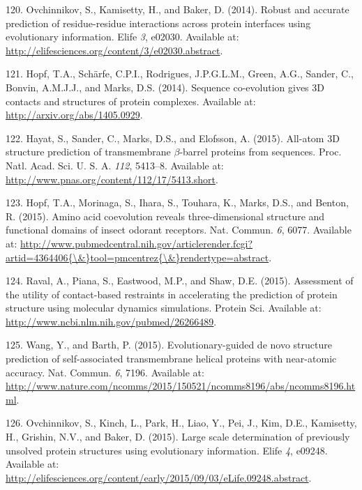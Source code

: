 \documentclass[11pt,a4paper,twoside]{book}
\theoremstyle{definition}
\theoremstyle{definition}
\theoremstyle{remark}
\begin{document}
\hypertarget{ref-Ovchinnikov2014a}{}
120. Ovchinnikov, S., Kamisetty, H., and Baker, D. (2014). Robust and
accurate prediction of residue-residue interactions across protein
interfaces using evolutionary information. Elife \emph{3}, e02030.
Available at: \url{http://elifesciences.org/content/3/e02030.abstract}.

\hypertarget{ref-Hopf2014}{}
121. Hopf, T.A., Schärfe, C.P.I., Rodrigues, J.P.G.L.M., Green, A.G.,
Sander, C., Bonvin, A.M.J.J., and Marks, D.S. (2014). Sequence
co-evolution gives 3D contacts and structures of protein complexes.
Available at: \url{http://arxiv.org/abs/1405.0929}.

\hypertarget{ref-Hayat2015a}{}
122. Hayat, S., Sander, C., Marks, D.S., and Elofsson, A. (2015).
All-atom 3D structure prediction of transmembrane \(\beta\)-barrel
proteins from sequences. Proc. Natl. Acad. Sci. U. S. A. \emph{112},
5413--8. Available at:
\url{http://www.pnas.org/content/112/17/5413.short}.

\hypertarget{ref-Hopf2015a}{}
123. Hopf, T.A., Morinaga, S., Ihara, S., Touhara, K., Marks, D.S., and
Benton, R. (2015). Amino acid coevolution reveals three-dimensional
structure and functional domains of insect odorant receptors. Nat.
Commun. \emph{6}, 6077. Available at:
\href{http://www.pubmedcentral.nih.gov/articlerender.fcgi?artid=4364406\%7B/\&\%7Dtool=pmcentrez\%7B/\&\%7Drendertype=abstract}{http://www.pubmedcentral.nih.gov/articlerender.fcgi?artid=4364406\{\textbackslash{}\&\}tool=pmcentrez\{\textbackslash{}\&\}rendertype=abstract}.

\hypertarget{ref-Raval2015a}{}
124. Raval, A., Piana, S., Eastwood, M.P., and Shaw, D.E. (2015).
Assessment of the utility of contact-based restraints in accelerating
the prediction of protein structure using molecular dynamics
simulations. Protein Sci. Available at:
\url{http://www.ncbi.nlm.nih.gov/pubmed/26266489}.

\hypertarget{ref-Wang2015}{}
125. Wang, Y., and Barth, P. (2015). Evolutionary-guided de novo
structure prediction of self-associated transmembrane helical proteins
with near-atomic accuracy. Nat. Commun. \emph{6}, 7196. Available at:
\url{http://www.nature.com/ncomms/2015/150521/ncomms8196/abs/ncomms8196.html}.

\hypertarget{ref-Ovchinnikov2015a}{}
126. Ovchinnikov, S., Kinch, L., Park, H., Liao, Y., Pei, J., Kim, D.E.,
Kamisetty, H., Grishin, N.V., and Baker, D. (2015). Large scale
determination of previously unsolved protein structures using
evolutionary information. Elife \emph{4}, e09248. Available at:
\url{http://elifesciences.org/content/early/2015/09/03/eLife.09248.abstract}.
\end{document}
